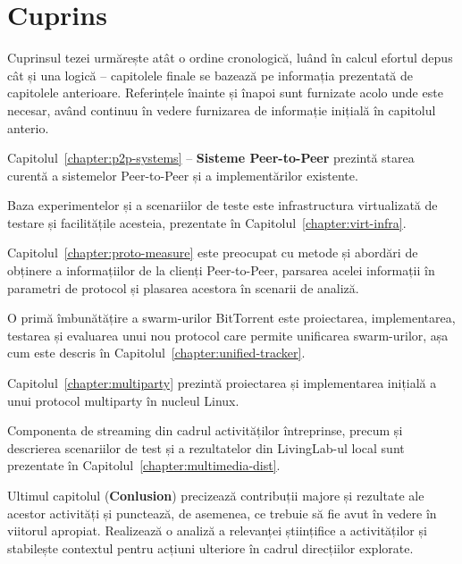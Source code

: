 \section{Cuprins}
\label{sec:intro:contents}

Cuprinsul tezei urmărește atât o ordine cronologică, luând în calcul efortul
depus cât și una logică -- capitolele finale se bazează pe informația
prezentată de capitolele anterioare. Referințele înainte și înapoi sunt
furnizate acolo unde este necesar, având continuu în vedere furnizarea de
informație inițială în capitolul anterio.

Capitolul~\ref{chapter:p2p-systems} -- \textbf{Sisteme Peer-to-Peer} prezintă
starea curentă a sistemelor Peer-to-Peer și a implementărilor existente.

Baza experimentelor și a scenariilor de teste este infrastructura virtualizată
de testare și facilitățile acesteia, prezentate în
Capitolul~\ref{chapter:virt-infra}.

Capitolul~\ref{chapter:proto-measure} este preocupat cu metode și abordări de
obținere a informațiilor de la clienți Peer-to-Peer, parsarea acelei
informații în parametri de protocol și plasarea acestora în scenarii de
analiză.

O primă îmbunătățire a swarm-urilor BitTorrent este proiectarea,
implementarea, testarea și evaluarea unui nou protocol care permite unificarea
swarm-urilor, așa cum este descris în Capitolul~\ref{chapter:unified-tracker}.

Capitolul~\ref{chapter:multiparty} prezintă proiectarea și implementarea
inițială a unui protocol multiparty în nucleul Linux.

Componenta de streaming din cadrul activităților întreprinse, precum și
descrierea scenariilor de test și a rezultatelor din LivingLab-ul local sunt
prezentate în Capitolul~\ref{chapter:multimedia-dist}.

Ultimul capitolul (\textbf{Conlusion}) precizează contribuții majore și
rezultate ale acestor activități și punctează, de asemenea, ce trebuie să fie
avut în vedere în viitorul apropiat. Realizează o analiză a relevanței
științifice a activităților și stabilește contextul pentru acțiuni ulteriore
în cadrul direcțiilor explorate.
